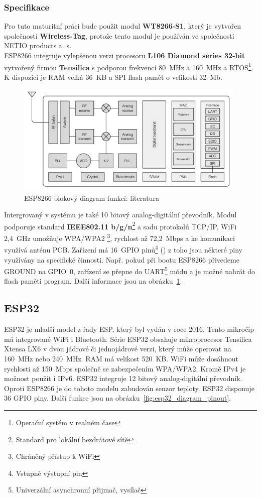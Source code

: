 \documentclass[a4paper, 12pt]{report}
\begin{document}
    \subsubsection{Specifikace}
    Pro tuto maturitní práci bude použit modul \textbf{WT8266-S1}, který je vytvořen společností \textbf{Wireless-Tag}, protože tento modul je používán ve společnosti NETIO products a. s.\\
    ESP8266 integruje vylepšenou verzi procesoru \textbf{L106 Diamond series 32-bit} vytvořený firmou \textbf{Tensilica} s podporou frekvencí 80~\si{MHz} a 160~\si{MHz} a RTOS\footnote{Operační systém v realném čase}.
    K dispozici je RAM velká 36~\si{KB} a SPI flash paměť o velikosti 32~\si{Mb}.
    \begin{figure}[h!]
        \centering
        \includegraphics[width=11cm]{images/ESP8266_diagram}
        \caption{ESP8266 blokový diagram funkcí: literatura~\cite{ESP8266}}
        \label{fig:esp8266_diagram}
    \end{figure}

    Intergrovaný v systému je také 10 bitový analog-digitální převodník.
    Modul podporuje standard \textbf{IEEE802.11 b/g/n}\footnote{Standard pro lokální bezdrátové sítě} a sadu protokolů TCP/IP. WiFi 2,4~\si{GHz} umožňuje WPA/WPA2 \footnote{Chráněný přístup k WiFi}, rychlost až 72,2~\si{Mbps} a ke komunikaci využívá anténu PCB. Zařízení má 16~GPIO pinů\footnote{Vstupně výstupní pin} () z toho jsou některé piny využívány na specifické činnosti.
    Např. pokud při bootu ESP8266 přivedeme GROUND na GPIO~0, zařízení se přepne do UART\footnote{Univerzální asynchronní přijmač, vysílač} módu a je možné nahrát do flash paměti program. Další informace jsou na obrázku~\ref{fig:esp8266_diagram}.


    \subsection{ESP32}
    ESP32 je mladší model z řady ESP, který byl vydán v roce 2016.
    Tento mikročip má integrované WiFi i Bluetooth.
    Série ESP32 obsahuje mikroprocesor Tensilica Xtensa LX6 v dvou jádrové či jednojádrové verzi, který může operovat na 160~\si{MHz} nebo 240~\si{MHz}.
    RAM má velikost 520~\si{KB}.
    WiFi může dosáhnout rychlosti až 150~\si{Mbps} společně se zabezpečením WPA/WPA2. Kromě IPv4 je možnost použít i IPv6.
    ESP32 integruje 12 bitový analog-digitální převodník.
    Oproti ESP8266 je do tohoto modelu zabudován senzor teploty.
    ESP32 disponuje 36 GPIO piny.
    Další funkce jsou na obrázku~\ref{fig:esp32_diagram_pinout}. \\
\end{document}
